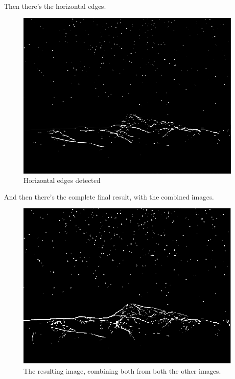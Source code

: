 	Then there's the horizontal edges.
	\begin{figure}[H]
		\centering
		\includegraphics[width=0.6\linewidth]{figure/yEdge}
		\caption{Horizontal edges detected}
		\label{fig:yEdge}
	\end{figure}\newpage
And then there's the complete final result, with the combined images.
\begin{figure}[H]
	\centering
	\includegraphics[width=0.6\linewidth]{figure/finalGradient}
	\caption{The resulting image, combining both from both the other images.}
	\label{fig:finalGradient}
\end{figure}

